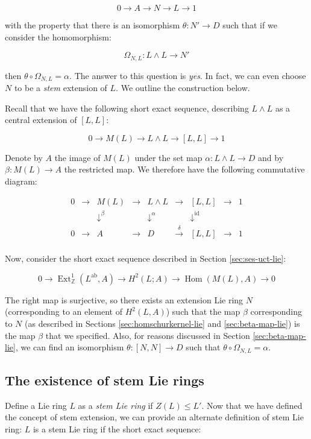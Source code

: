 \documentclass{ucetd}
\begin{document}
$$0 \to A \to N \to L \to 1$$

with the property that there is an isomorphism $\theta:N' \to D$ such
that if we consider the homomorphism:

$$\Omega_{N,L}: L \wedge L \to N'$$

then $\theta \circ \Omega_{N,L} = \alpha$. The answer to this question is
{\em yes}. In fact, we can even choose $N$ to be a {\em stem}
extension of $L$. We outline the construction below.

Recall that we have the following short exact sequence, describing $L
\wedge L$ as a central extension of $[L,L]$:

$$0 \to M(L) \to L \wedge L \to [L,L] \to 1$$

Denote by $A$ the image of $M(L)$ under the set map $\alpha:L \wedge L
\to D$ and by $\beta:M(L) \to A$ the restricted map. We therefore
have the following commutative diagram:

$$\begin{array}{ccccccccc}
  0 & \to & M(L) & \to & L \wedge L & \to & [L,L] & \to & 1\\
  &&   \downarrow^{\beta}  &&  \downarrow^{\alpha}     && \downarrow^{\text{id}} && \\
  0 & \to & A &\to & D & \stackrel{\delta}{\to} & [L,L] & \to & 1\\
\end{array}$$

Now, consider the short exact sequence described in Section
\ref{sec:ses-uct-lie}:

$$0 \to \operatorname{Ext}^1_{\mathbb{Z}}(L^{\operatorname{ab}},A) \to H^2(L;A) \to \operatorname{Hom}(M(L),A) \to 0$$

The right map is surjective, so there exists an extension Lie ring $N$
(corresponding to an element of $H^2(L,A)$) such that the map $\beta$
corresponding to $N$ (as described in Sections
\ref{sec:homschurkernel-lie} and \ref{sec:beta-map-lie}) is the map $\beta$
that we specified. Also, for reasons discussed in Section
\ref{sec:beta-map-lie}, we can find an isomorphism $\theta:[N,N] \to D$
such that $\theta \circ \Omega_{N,L} = \alpha$.

\subsection{The existence of stem Lie rings}\label{sec:stem-lie-ring-existence}

Define a Lie ring $L$ as a {\em stem Lie ring} if $Z(L) \le L'$. Now
that we have defined the concept of stem extension, we can provide an
alternate definition of stem Lie ring: $L$ is a stem Lie ring if the
short exact sequence:
\end{document}
